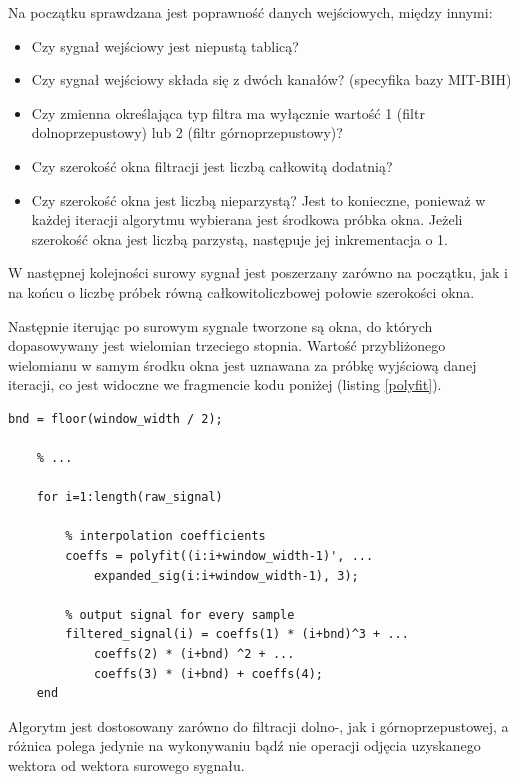 \documentclass[a4paper]{article}
\begin{document}
Na początku sprawdzana jest poprawność danych wejściowych, między innymi:
\begin{itemize}
\item Czy sygnał wejściowy jest niepustą tablicą?
\item Czy sygnał wejściowy składa się z dwóch kanałów? (specyfika bazy MIT-BIH)
\item Czy zmienna określająca typ filtra ma wyłącznie wartość 1 (filtr dolnoprzepustowy) lub 2 (filtr górnoprzepustowy)?
\item Czy szerokość okna filtracji jest liczbą całkowitą dodatnią?
\item Czy szerokość okna jest liczbą nieparzystą? Jest to konieczne, ponieważ w każdej iteracji algorytmu wybierana jest środkowa próbka okna. Jeżeli szerokość okna jest liczbą parzystą, następuje jej inkrementacja o 1.
\end{itemize}

W następnej kolejności surowy sygnał jest poszerzany zarówno na początku, jak i na końcu o liczbę próbek równą całkowitoliczbowej połowie szerokości okna.

Następnie iterując po surowym sygnale tworzone są okna, do których dopasowywany jest wielomian trzeciego stopnia. Wartość przybliżonego wielomianu w samym środku okna jest uznawana za próbkę wyjściową danej iteracji, co jest widoczne we fragmencie kodu poniżej (listing \ref{polyfit}).


\begin{lstlisting}[caption=Fragment algorytmu realizujący dopasowanie wielomianu trzeciego stopnia i obliczenie wartości wyjściowej danej próbki jako wartość funkcji wielomianowej w środku okna rozpoczynającego się w tej próbce., label=polyfit]
    bnd = floor(window_width / 2);
    
	% ... 
    
    for i=1:length(raw_signal)

        % interpolation coefficients       
        coeffs = polyfit((i:i+window_width-1)', ...
            expanded_sig(i:i+window_width-1), 3);

        % output signal for every sample        
        filtered_signal(i) = coeffs(1) * (i+bnd)^3 + ...
            coeffs(2) * (i+bnd) ^2 + ...
            coeffs(3) * (i+bnd) + coeffs(4);
    end
\end{lstlisting}

Algorytm jest dostosowany zarówno do filtracji dolno-, jak i górnoprzepustowej, a różnica polega jedynie na wykonywaniu bądź nie operacji odjęcia uzyskanego wektora od wektora surowego sygnału.
\end{document}
